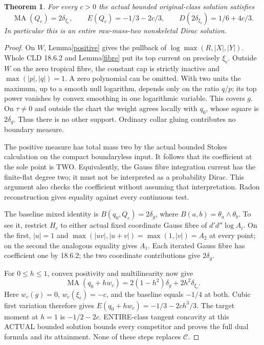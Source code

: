 \documentclass[11pt]{article}
\newtheorem{theorem}{Theorem}
\newcommand{\DD}{d'd''}
\newcommand{\MA}{\operatorname{MA}}
\newcommand{\C}{\mathcal C}
\begin{document}
\begin{theorem}\label{dirac}
For every $c>0$ the actual bounded original-class solution satisfies
\[
 \MA(Q_c)=2\delta_{\xi_c},\qquad
 E(Q_c)=-1/3-2c/3,\qquad D(2\delta_{\xi_c})=1/6+4c/3.
\]
In particular this is an entire raw-mass-two nonskeletal Dirac solution.
\end{theorem}
\begin{proof}
On $W$, Lemma\ref{positive} gives the pullback of
$\log\max(R,|X|,|Y|)$. Whole CLD 18.6.2 and Lemma\ref{fibre}
put its top current on precisely $\xi_c$. Outside $W$ on the
zero tropical fibre, the constant cap is strictly inactive and
$\max(|p|,|q|)=1$. A zero polynomial can be omitted. With two
units the maximum, up to a smooth null logarithm, depends only
on the ratio $q/p$; its top power vanishes by convex smoothing
in one logarithmic variable. This covers $g$. On $\tau\ne0$ and
outside the chart the weight agrees locally with $q_0$, whose
square is $2\delta_g$. Thus there is no other support.
Ordinary collar gluing contributes no boundary measure.

The positive measure has total mass two by the actual bounded
Stokes calculation on the compact boundaryless input. It follows
that its coefficient at the sole point is TWO. Equivalently,
the Gauss fibre integration current has the finite-flat degree two;
it must not be interpreted as a probability Dirac. This argument
also checks the coefficient without assuming that interpretation.
Radon reconstruction gives equality against every continuous test.

The baseline mixed identity is
$B(q_0,Q_c)=2\delta_g$, where $B(a,b)=\theta_a\wedge\theta_b$.
To see it, restrict $H_c$ to either actual fixed coordinate
Gauss fibre of $\DD\log A_i$. On the first, $|u|=1$ and
$\max(|uv|,|u+v|)=\max(1,|v|)=A_2$ at every point;
on the second the analogous equality gives $A_1$.
Each iterated Gauss fibre has coefficient one by 18.6.2;
the two coordinate contributions give $2\delta_g$.

For $0\le h\le1$, convex positivity and multilinearity now give
\[
 \MA(q_0+h w_c)=2(1-h^2)\delta_g+2h^2\delta_{\xi_c}.
\]
Here $w_c(g)=0$, $w_c(\xi_c)=-c$, and the baseline equals
$-1/4$ at both. Cubic first variation therefore gives
$E(q_0+h w_c)=-1/3-2c h^3/3$. The target moment at $h=1$
is $-1/2-2c$. ENTIRE-class tangent concavity at this ACTUAL
bounded solution bounds every competitor and proves the full dual
formula and its attainment. None of these steps replaces $\C$.
\end{proof}
\end{document}
